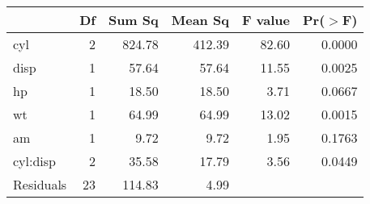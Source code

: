 \begin{tabular}{lrrrrr}
  \hline
 & Df & Sum Sq & Mean Sq & F value & Pr($>$F) \\ 
  \hline
cyl & 2 & 824.78 & 412.39 & 82.60 & 0.0000 \\ 
  disp & 1 & 57.64 & 57.64 & 11.55 & 0.0025 \\ 
  hp & 1 & 18.50 & 18.50 & 3.71 & 0.0667 \\ 
  wt & 1 & 64.99 & 64.99 & 13.02 & 0.0015 \\ 
  am & 1 & 9.72 & 9.72 & 1.95 & 0.1763 \\ 
  cyl:disp & 2 & 35.58 & 17.79 & 3.56 & 0.0449 \\ 
  Residuals & 23 & 114.83 & 4.99 &  &  \\ 
   \hline
\end{tabular}
